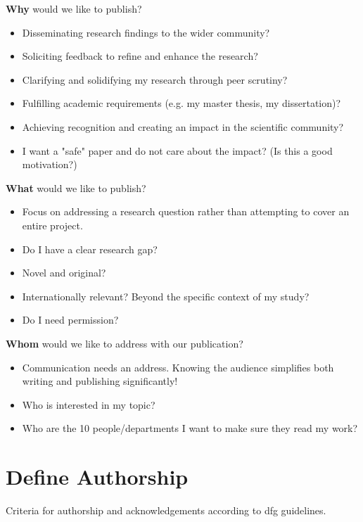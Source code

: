 \documentclass[
    twocolumn,
    fontsize = 10pt,
    parskip = half+,
    headings = small,
    headwidth = text,
    footwidth = text,
]{scrartcl}
\begin{document}
\textbf{Why} would we like to publish?
\begin{itemize}
    \item Disseminating research findings to the wider community?
    \item Soliciting feedback to refine and enhance the research?
    \item Clarifying and solidifying my research through peer scrutiny?
    \item Fulfilling academic requirements (e.g. my master thesis, my dissertation)?
    \item Achieving recognition and creating an impact in the scientific community?
    \item I want a "safe" paper and do not care about the impact? (Is this a good motivation?)
\end{itemize}

\textbf{What} would we like to publish?
\begin{itemize}
    \item Focus on addressing a research question rather than attempting to cover an entire project.
    \item Do I have a clear research gap?
    \item Novel and original?
    \item Internationally relevant? Beyond the specific context of my  study?
    \item Do I need permission? 
\end{itemize}

\textbf{Whom} would we like to address with our publication?
\begin{itemize}
    \item Communication needs an address. Knowing the audience simplifies both writing and publishing significantly!
    \item Who is interested in my topic?
    \item Who are the 10 people/departments I want to make sure they read my work?
\end{itemize}

\section{Define Authorship}
Criteria for authorship and acknowledgements according to \Gls{dfg} guidelines. 
\end{document}
